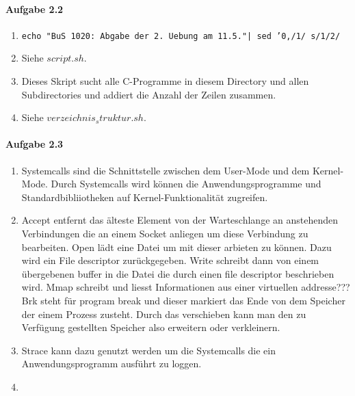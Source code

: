 \documentclass[11pt]{article}
\begin{document}

\paragraph{Aufgabe 2.2}
\begin{enumerate}[label = \alph*)]
\item \texttt{echo "BuS 1020: Abgabe der 2. Uebung am 11.5."| sed '0,/1/ s/1/2/}

\item Siehe $script.sh$.

\item Dieses Skript sucht alle C-Programme in diesem Directory und allen Subdirectories und addiert die Anzahl der Zeilen zusammen.

\item Siehe $verzeichnis_struktur.sh$.

\end{enumerate}

\paragraph{Aufgabe 2.3}
\begin{enumerate}[label = \alph*)]
\item Systemcalls sind die Schnittstelle zwischen dem User-Mode und dem Kernel-Mode. Durch Systemcalls wird können die Anwendungsprogramme und Standardbibliiotheken auf Kernel-Funktionalität zugreifen.

\item Accept entfernt das älteste Element von der Warteschlange an anstehenden Verbindungen die an einem Socket anliegen um diese Verbindung zu bearbeiten. Open lädt eine Datei um mit dieser arbieten zu können. Dazu wird ein File descriptor zurückgegeben. Write schreibt dann von einem übergebenen buffer in die Datei die durch einen file descriptor beschrieben wird. Mmap schreibt und liesst Informationen aus einer virtuellen addresse??? Brk steht für program break und dieser markiert das Ende von dem Speicher der einem Prozess zusteht. Durch das verschieben kann man den zu Verfügung gestellten Speicher also erweitern oder verkleinern.

\item Strace kann dazu genutzt werden um die Systemcalls die ein Anwendungsprogramm ausführt zu loggen.

\item 
\end{enumerate}
\end{document}
